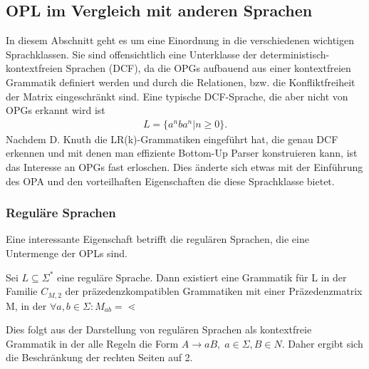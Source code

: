 \subsection{OPL im Vergleich mit anderen Sprachen}
In diesem Abschnitt geht es um eine Einordnung in die verschiedenen wichtigen Sprachklassen. Sie sind offensichtlich eine Unterklasse der deterministisch-kontextfreien Sprachen (DCF), da die OPGs aufbauend aus einer kontextfreien Grammatik definiert werden und durch die Relationen, bzw. die Konfliktfreiheit der Matrix eingeschränkt sind. Eine typische DCF-Sprache, die aber nicht von OPGs erkannt wird ist
\begin{align*}
L=\{a^nba^n|n \geq 0 \}.
\end{align*}
Nachdem D. Knuth die LR(k)-Grammatiken eingeführt hat, die genau DCF erkennen und mit denen man effiziente Bottom-Up Parser konstruieren kann, ist das Interesse an OPGs fast erloschen. Dies änderte sich etwas mit der Einführung des OPA und den vorteilhaften Eigenschaften die diese Sprachklasse bietet.
\subsubsection{Reguläre Sprachen}
Eine interessante Eigenschaft betrifft die regulären Sprachen, die eine Untermenge der OPLs sind.\cite{op_vpl_property}
\begin{lemma}
Sei $L\subseteq\Sigma^*$ eine reguläre Sprache. Dann existiert eine Grammatik für L in der Familie $C_{M,2}$ der präzedenzkompatiblen Grammatiken mit einer Präzedenzmatrix M, in der $\forall a,b\in \Sigma: M_{ab}=\lessdot$
\end{lemma}
Dies folgt aus der Darstellung von regulären Sprachen als kontextfreie Grammatik in der alle Regeln die Form $A\rightarrow aB, \; a \in \Sigma, B \in N$. Daher ergibt sich die Beschränkung der rechten Seiten auf 2.

